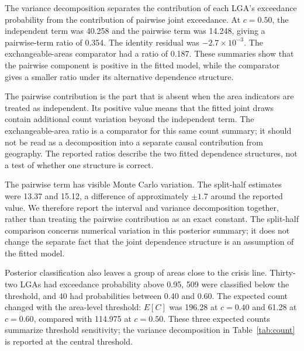 The variance decomposition separates the contribution of each LGA's exceedance probability from the contribution of pairwise joint exceedance. At \(c=0.50\), the independent term was 40.258 and the pairwise term was 14.248, giving a pairwise-term ratio of 0.354. The identity residual was \(-2.7\times 10^{-3}\). The exchangeable-areas comparator had a ratio of 0.187. These summaries show that the pairwise component is positive in the fitted model, while the comparator gives a smaller ratio under its alternative dependence structure.

The pairwise contribution is the part that is absent when the area indicators are treated as independent. Its positive value means that the fitted joint draws contain additional count variation beyond the independent term. The exchangeable-area ratio is a comparator for this same count summary; it should not be read as a decomposition into a separate causal contribution from geography. The reported ratios describe the two fitted dependence structures, not a test of whether one structure is correct.

The pairwise term has visible Monte Carlo variation. The split-half estimates were 13.37 and 15.12, a difference of approximately \(\pm 1.7\) around the reported value. We therefore report the interval and variance decomposition together, rather than treating the pairwise contribution as an exact constant. The split-half comparison concerns numerical variation in this posterior summary; it does not change the separate fact that the joint dependence structure is an assumption of the fitted model.

Posterior classification also leaves a group of areas close to the crisis line. Thirty-two LGAs had exceedance probability above 0.95, 509 were classified below the threshold, and 40 had probabilities between 0.40 and 0.60. The expected count changed with the area-level threshold: \(E[C]\) was 196.28 at \(c=0.40\) and 61.28 at \(c=0.60\), compared with 114.975 at \(c=0.50\). These three expected counts summarize threshold sensitivity; the variance decomposition in Table~\ref{tab:count} is reported at the central threshold.

